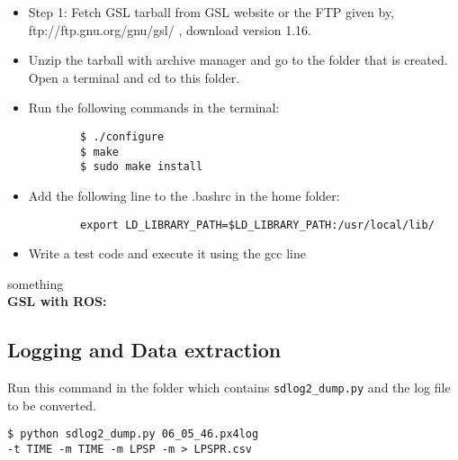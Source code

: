 \documentclass{article}
\begin{document}
\begin{itemize}
	\item Step 1: Fetch GSL tarball from GSL website or the FTP given by,  ftp://ftp.gnu.org/gnu/gsl/ , download version 1.16.
	\item Unzip the tarball with archive manager and go to the folder that is created. Open a terminal and cd to this folder. 
	\item Run the following commands in the terminal:
	\begin{lstlisting}
		$ ./configure
		$ make
		$ sudo make install
	\end{lstlisting}
	\item Add the following line to the .bashrc in the home folder:
	\begin{lstlisting}
		export LD_LIBRARY_PATH=$LD_LIBRARY_PATH:/usr/local/lib/
	\end{lstlisting} 
	\item Write a test code and execute it using the gcc line
\end{itemize}
something
\\\textbf{GSL with ROS:}


\subsection{Logging and Data extraction}

Run this command in the folder which contains \texttt{sdlog2\_dump.py} and the log file to be converted.
\begin{lstlisting}
$ python sdlog2_dump.py 06_05_46.px4log 
-t TIME -m TIME -m LPSP -m > LPSPR.csv
\end{lstlisting}




\end{document}
